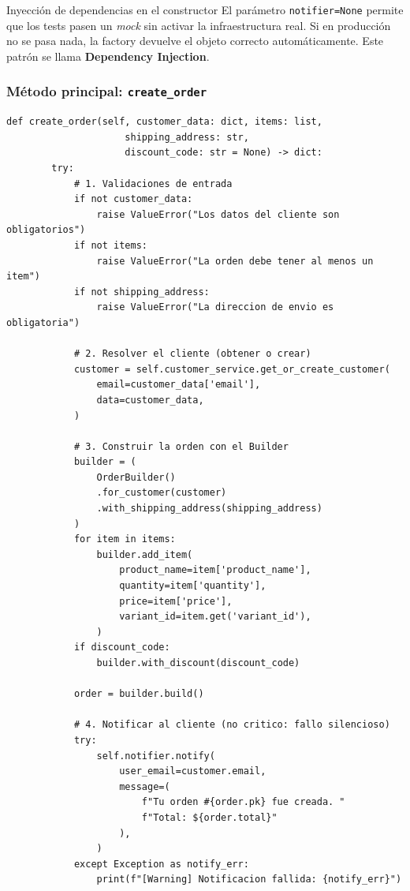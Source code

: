 \documentclass[12pt, a4paper]{article}
\begin{document}
\begin{conceptbox}{Inyección de dependencias en el constructor}
El parámetro \texttt{notifier=None} permite que los tests pasen un \textit{mock} sin activar la infraestructura real. Si en producción no se pasa nada, la factory devuelve el objeto correcto automáticamente. Este patrón se llama \textbf{Dependency Injection}.
\end{conceptbox}

\subsubsection{Método principal: \texttt{create\_order}}

\begin{lstlisting}[caption={orders/services.py — create\_order}]
    def create_order(self, customer_data: dict, items: list,
                     shipping_address: str,
                     discount_code: str = None) -> dict:
        try:
            # 1. Validaciones de entrada
            if not customer_data:
                raise ValueError("Los datos del cliente son obligatorios")
            if not items:
                raise ValueError("La orden debe tener al menos un item")
            if not shipping_address:
                raise ValueError("La direccion de envio es obligatoria")

            # 2. Resolver el cliente (obtener o crear)
            customer = self.customer_service.get_or_create_customer(
                email=customer_data['email'],
                data=customer_data,
            )

            # 3. Construir la orden con el Builder
            builder = (
                OrderBuilder()
                .for_customer(customer)
                .with_shipping_address(shipping_address)
            )
            for item in items:
                builder.add_item(
                    product_name=item['product_name'],
                    quantity=item['quantity'],
                    price=item['price'],
                    variant_id=item.get('variant_id'),
                )
            if discount_code:
                builder.with_discount(discount_code)

            order = builder.build()

            # 4. Notificar al cliente (no critico: fallo silencioso)
            try:
                self.notifier.notify(
                    user_email=customer.email,
                    message=(
                        f"Tu orden #{order.pk} fue creada. "
                        f"Total: ${order.total}"
                    ),
                )
            except Exception as notify_err:
                print(f"[Warning] Notificacion fallida: {notify_err}")


\end{lstlisting}
\end{document}
